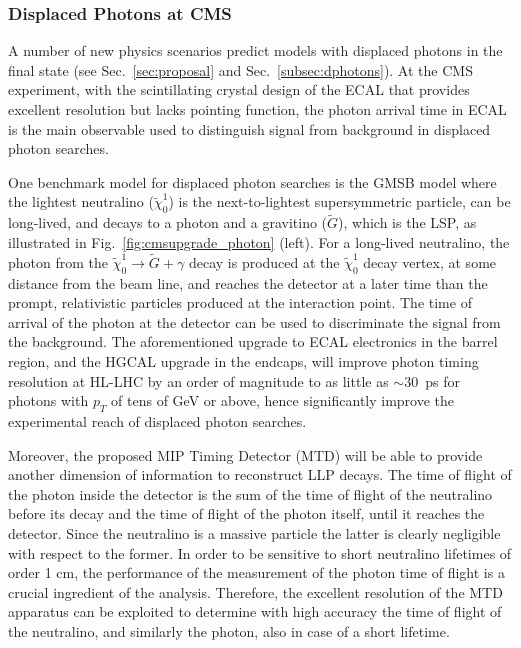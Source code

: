 \subsubsection{Displaced Photons at CMS}

A number of new physics scenarios predict  models with displaced photons in the final state (see Sec.~\ref{sec:proposal} and Sec.~\ref{subsec:dphotons}). 
At the CMS experiment, with the scintillating crystal design of the ECAL that provides excellent resolution but lacks pointing function, the photon arrival time in ECAL is the main observable used to distinguish signal from
background in displaced photon searches. 

One benchmark model for displaced photon searches is the GMSB model 
where the lightest neutralino ($\tilde{\chi}_0^1$) is the next-to-lightest supersymmetric particle, can be long-lived, and decays to a photon and a gravitino ($\tilde{G}$), which is the LSP, as illustrated in Fig.~\ref{fig:cmsupgrade_photon} (left).
For a long-lived neutralino, the photon from the $\tilde{\chi}_0^1\to\tilde{G}+\gamma$ decay is produced at the $\tilde{\chi}_0^1$
decay vertex, at some distance from the beam line, and reaches the detector at a later time than
the prompt, relativistic particles produced at the interaction point. 
The time of arrival of the photon at the detector can be used to discriminate the signal from the background.
The aforementioned upgrade to ECAL electronics in the barrel region, and the HGCAL upgrade in the endcaps, will improve photon timing resolution at HL-LHC by an order of magnitude to as little as $\sim30$~ps for photons with $p_T$ of tens of GeV or above, hence significantly improve the experimental reach of displaced photon searches. 

Moreover, the proposed MIP Timing Detector (MTD) will be able to provide another dimension of information to reconstruct LLP decays. 
The time of flight of the photon inside the detector is the sum of the time of flight of the neutralino before its decay and the time of flight of the photon itself, until it reaches the detector.
Since the neutralino is a massive particle the latter is clearly negligible with respect to the former. 
In order to be sensitive to short neutralino lifetimes of order 1 cm, the performance of the measurement of the photon time of flight is a crucial ingredient of the analysis. 
Therefore, the excellent resolution of the MTD apparatus can be exploited to determine with high accuracy the time of flight of the neutralino, and similarly the photon, also in case of a short lifetime.

